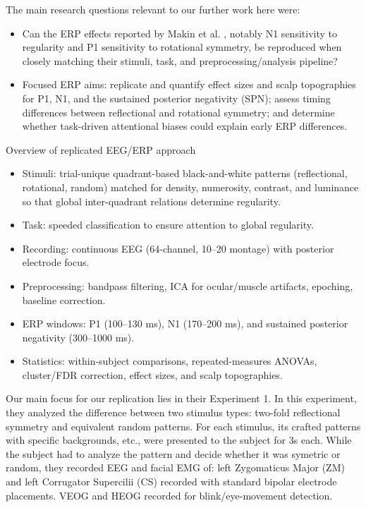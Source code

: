 \documentclass{scrartcl}
\begin{document}
The main research questions relevant to our further work here were:
\begin{itemize}
    \item Can the ERP effects reported by Makin et al. \cite{paper}, notably N1 sensitivity to regularity and P1 sensitivity to rotational symmetry, be reproduced when closely matching their stimuli, task, and preprocessing/analysis pipeline?
    \item Focused ERP aims: replicate and quantify effect sizes and scalp topographies for P1, N1, and the sustained posterior negativity (SPN); assess timing differences between reflectional and rotational symmetry; and determine whether task-driven attentional biases could explain early ERP differences.
\end{itemize}

Overview of replicated EEG/ERP approach
\begin{itemize}
    \item Stimuli: trial-unique quadrant-based black-and-white patterns (reflectional, rotational, random) matched for density, numerosity, contrast, and luminance so that global inter-quadrant relations determine regularity.
    \item Task: speeded classification to ensure attention to global regularity.
    \item Recording: continuous EEG (64-channel, 10–20 montage) with posterior electrode focus.
    \item Preprocessing: bandpass filtering, ICA for ocular/muscle artifacts, epoching, baseline correction.
    \item ERP windows: P1 (100–130 ms), N1 (170–200 ms), and sustained posterior negativity (300–1000 ms).
    \item Statistics: within-subject comparisons, repeated-measures ANOVAs, cluster/FDR correction, effect sizes, and scalp topographies.
\end{itemize}

Our main focus for our replication lies in their Experiment 1.
In this experiment, they analyzed the difference between two stimulus types: two-fold reflectional symmetry and equivalent random patterns.
For each stimulus, its crafted patterns with specific backgrounds, etc., were presented to the subject for 3s each.
While the subject had to analyze the pattern and decide whether it was symetric or random, they recorded EEG and facial EMG of: left Zygomaticus Major (ZM) and left Corrugator Supercilii (CS) recorded with standard bipolar electrode placements. VEOG and HEOG recorded for blink/eye-movement detection.
\end{document}
